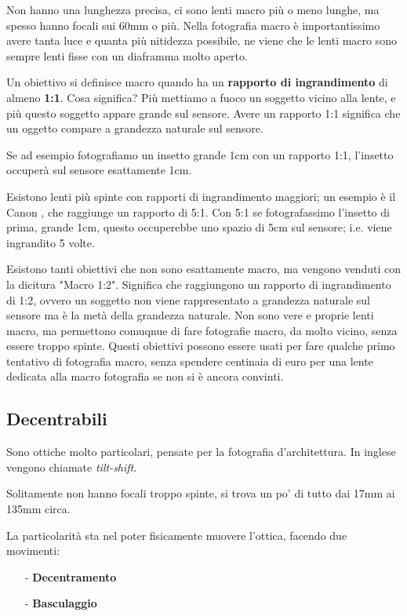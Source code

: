 Non hanno una lunghezza precisa, ci sono lenti macro più o meno lunghe, ma spesso hanno focali sui 60mm o più.\newline
Nella fotografia macro è importantissimo avere tanta luce e quanta più nitidezza possibile, ne viene che le lenti macro sono sempre lenti fisse con un diaframma molto aperto.

Un obiettivo si definisce macro quando ha un \textbf{rapporto di ingrandimento} di almeno \textbf{1:1}. Cosa significa?
Più mettiamo a fuoco un soggetto vicino alla lente, e più questo soggetto appare grande sul sensore. Avere un rapporto 1:1 significa che un oggetto compare a grandezza naturale sul sensore.

Se ad esempio fotografiamo un insetto grande 1cm con un rapporto 1:1, l'insetto occuperà sul sensore esattamente 1cm.

Esistono lenti più spinte con rapporti di ingrandimento maggiori; un esempio è il Canon , che raggiunge un rapporto di 5:1. Con 5:1 se fotografassimo l'insetto di prima, grande 1cm, questo occuperebbe uno spazio di 5cm sul sensore; i.e. viene ingrandito 5 volte.

Esistono tanti obiettivi che non sono esattamente macro, ma vengono venduti con la dicitura "Macro 1:2". Significa che raggiungono un rapporto di ingrandimento di 1:2, ovvero un soggetto non viene rappresentato a grandezza naturale sul sensore ma è la metà della grandezza naturale. Non sono vere e proprie lenti macro, ma permettono comuqnue di fare fotografie macro, da molto vicino, senza essere troppo spinte. Questi obiettivi possono essere usati per fare qualche primo tentativo di fotografia macro, senza spendere centinaia di euro per una lente dedicata alla macro fotografia se non si è ancora convinti.


\subsection{Decentrabili} \label{subsec:lentidecentrabili}
Sono ottiche molto particolari, pensate per la fotografia d'architettura. In inglese vengono chiamate \textit{tilt-shift}.

Solitamente non hanno focali troppo spinte, si trova un po' di tutto dai 17mm ai 135mm circa.

La particolarità sta nel poter fisicamente muovere l'ottica, facendo due movimenti:
\begin{itemize}
    \item[-] \textbf{Decentramento}
    \item[-] \textbf{Basculaggio}
\end{itemize}

